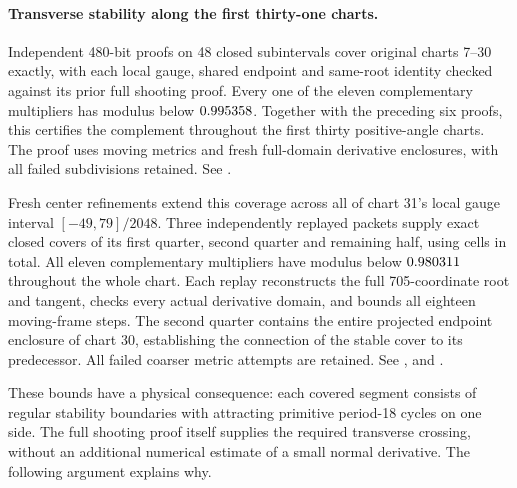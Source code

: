 \documentclass[11pt,letterpaper]{article}
\begin{document}
\paragraph{Transverse stability along the first thirty-one charts.}
Independent 480-bit proofs on 48 closed subintervals cover original charts
7--30 exactly, with each local gauge, shared endpoint and same-root identity
checked against its prior full shooting proof. Every one of the eleven
complementary multipliers has modulus below $0.995358$.
Together with the preceding six proofs, this certifies the complement
throughout the first thirty positive-angle charts. The proof
uses moving metrics and fresh full-domain derivative enclosures, with all
failed subdivisions retained. See
.

Fresh center refinements extend this coverage across all of chart 31's
local gauge interval $[-49,79]/2048$. Three independently replayed packets
supply exact closed covers of its first quarter, second quarter and remaining
half, using \nChartThirtyOneCells{} cells in total. All eleven complementary
multipliers have modulus below $0.980311$ throughout the
whole chart. Each replay reconstructs the full 705-coordinate root and tangent,
checks every actual derivative domain, and bounds all eighteen moving-frame
steps. The second quarter contains the entire projected endpoint enclosure
of chart 30, establishing the connection of the stable cover to its predecessor.
All failed coarser metric attempts are retained. See
,
 and
.

These bounds have a physical consequence: each covered segment consists of regular
stability boundaries with attracting primitive period-18 cycles on one side.
The full shooting proof itself supplies the required transverse crossing,
without an additional numerical estimate of a small normal derivative.
The following argument explains why.
\end{document}
